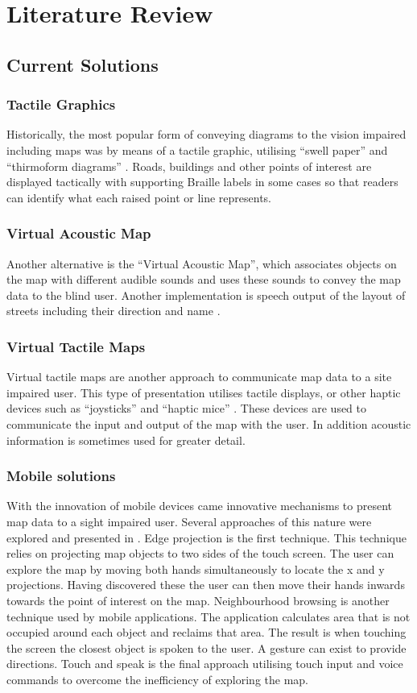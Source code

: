 \documentclass[11pt,twoside,a4paper]{article}
\begin{document}
\section{Literature Review}
\subsection{Current Solutions}
\subsubsection{Tactile Graphics}
Historically, the most popular form of conveying diagrams to the vision
impaired including maps was by means of a tactile graphic, utilising ``swell paper'' and ``thirmoform diagrams''
\cite{Roswell2003}. Roads, buildings and other points of interest are
displayed tactically with supporting Braille labels in some cases so that
readers can identify what each raised point or line represents.

\subsubsection{Virtual Acoustic Map}
Another alternative is the ``Virtual Acoustic Map'', which associates
objects on the map with different audible sounds and uses these sounds
to convey the map data to the blind user. Another implementation is speech output of the layout
of streets including their direction and name \cite{Hoeckner2012}.

\subsubsection{Virtual Tactile Maps}
Virtual tactile maps are another approach to communicate map data to a
site impaired user. This type of presentation utilises tactile displays,
or other haptic devices such as ``joysticks'' and ``haptic mice''
\cite{Parente2003}. These devices are used to communicate the input and
output of the map with the user. In addition acoustic information is
sometimes used for greater detail.

\subsubsection{Mobile solutions}
With the innovation of mobile devices came innovative mechanisms to
present map data to a sight impaired user. Several approaches of this
nature were explored and presented in \cite{Kane2011}. Edge projection
is the first technique. This technique relies on projecting map objects
to two sides of the touch screen. The user can explore the map by moving
both hands simultaneously to locate the x and y projections. Having
discovered these the user can then move their hands inwards towards the
point of interest on the map. Neighbourhood browsing is another
technique used by mobile applications. The application calculates area
that is not occupied around each object and reclaims that area. The
result is when touching the screen the closest object is spoken to the
user. A gesture can exist to provide directions. Touch and speak is the
final approach utilising touch input and voice commands to overcome the
inefficiency of exploring the map.
\end{document}
